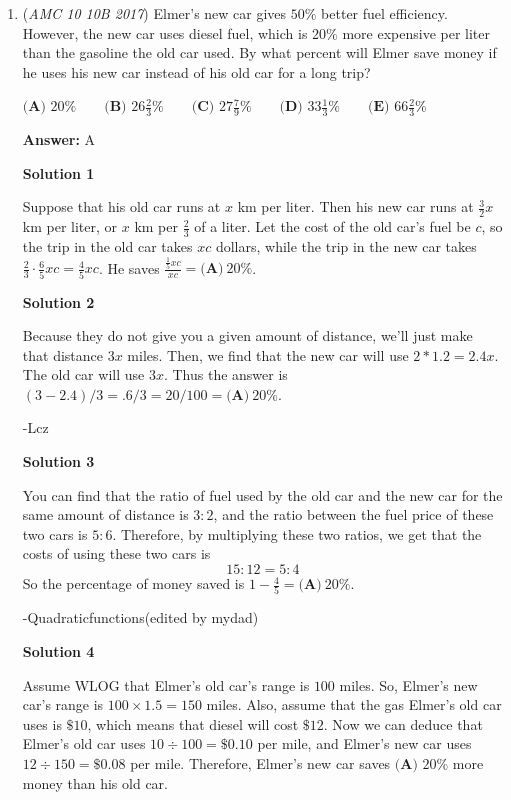 \begin{enumerate}
	\item (\textit{AMC 10 10B 2017}) Elmer's new car gives $50\%$ better fuel efficiency. However, the new car uses diesel fuel, which is $20\%$ more expensive per liter than the gasoline the old car used. By what percent will Elmer save money if he uses his new car instead of his old car for a long trip?


 $\textbf{(A) } 20\% \qquad \textbf{(B) } 26\frac23\% \qquad \textbf{(C) } 27\frac79\% \qquad \textbf{(D) } 33\frac13\% \qquad \textbf{(E) } 66\frac23\%$

 \textbf{Answer: }A



\textbf{Solution 1}

Suppose that his old car runs at $x$ km per liter. Then his new car runs at $\frac{3}{2}x$ km per liter, or $x$ km per $\frac{2}{3}$ of a liter. Let the cost of the old car's fuel be $c$, so the trip in the old car takes $xc$ dollars, while the trip in the new car takes $\frac{2}{3}\cdot\frac{6}{5}xc = \frac{4}{5}xc$. He saves $\frac{\frac{1}{5}xc}{xc} = \boxed{\textbf{(A)}\ 20\%}$.

 



\textbf{Solution 2}

Because they do not give you a given amount of distance, we'll just make that distance $3x$ miles. Then, we find that the new car will use $2*1.2=2.4x$. The old car will use $3x$. Thus the answer is $(3-2.4)/3=.6/3=20/100=  \boxed{\textbf{(A)}\ 20\%}$.

 -Lcz

 



\textbf{Solution 3}

You can find that the ratio of fuel used by the old car and the new car for the same amount of distance is $3 : 2$, and the ratio between the fuel price of these two cars is $5 : 6$. Therefore, by multiplying these two ratios, we get that the costs of using these two cars is 
 \[15 : 12 = 5 : 4\]So the percentage of money saved is $1 - \frac{4}{5} = \boxed{\textbf{(A)}\ 20\%}$.

 -Quadraticfunctions(edited by mydad)

 



\textbf{Solution 4}

Assume WLOG that Elmer's old car's range is $100$ miles. So, Elmer's new car's range is $100 \times 1.5 = 150$ miles. Also, assume that the gas Elmer's old car uses is $\$10$, which means that diesel will cost $\$12$. Now we can deduce that Elmer's old car uses $10 \div 100 = \$0.10$ per mile, and Elmer's new car uses $12 \div 150 = \$0.08$ per mile. Therefore, Elmer's new car saves $\boxed{\textbf{(A) }20\%}$ more money than his old car.


\end{enumerate}
